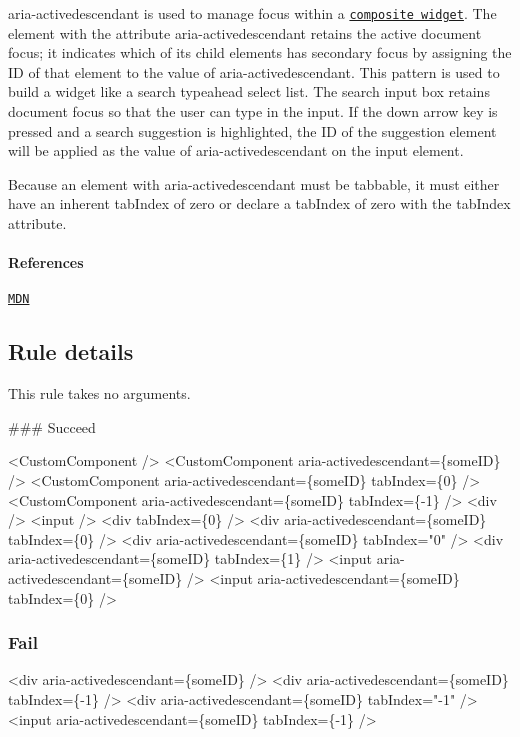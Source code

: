 {\ttfamily aria-\/activedescendant} is used to manage focus within a \href{https://www.w3.org/TR/wai-aria/roles#composite_header}{\tt composite widget}. The element with the attribute {\ttfamily aria-\/activedescendant} retains the active document focus; it indicates which of its child elements has secondary focus by assigning the ID of that element to the value of {\ttfamily aria-\/activedescendant}. This pattern is used to build a widget like a search typeahead select list. The search input box retains document focus so that the user can type in the input. If the down arrow key is pressed and a search suggestion is highlighted, the ID of the suggestion element will be applied as the value of {\ttfamily aria-\/activedescendant} on the input element.

Because an element with {\ttfamily aria-\/activedescendant} must be tabbable, it must either have an inherent {\ttfamily tab\+Index} of zero or declare a {\ttfamily tab\+Index} of zero with the {\ttfamily tab\+Index} attribute.

\paragraph*{References}


\begin{DoxyEnumerate}
\item \href{https://developer.mozilla.org/en-US/docs/Web/Accessibility/ARIA/ARIA_Techniques/Using_the_aria-activedescendant_attribute}{\tt M\+DN}
\end{DoxyEnumerate}

\subsection*{Rule details}

This rule takes no arguments.

\#\#\# Succeed 
\begin{DoxyCode}
<CustomComponent />
<CustomComponent aria-activedescendant=\{someID\} />
<CustomComponent aria-activedescendant=\{someID\} tabIndex=\{0\} />
<CustomComponent aria-activedescendant=\{someID\} tabIndex=\{-1\} />
<div />
<input />
<div tabIndex=\{0\} />
<div aria-activedescendant=\{someID\} tabIndex=\{0\} />
<div aria-activedescendant=\{someID\} tabIndex="0" />
<div aria-activedescendant=\{someID\} tabIndex=\{1\} />
<input aria-activedescendant=\{someID\} />
<input aria-activedescendant=\{someID\} tabIndex=\{0\} />
\end{DoxyCode}


\subsubsection*{Fail}


\begin{DoxyCode}
<div aria-activedescendant=\{someID\} />
<div aria-activedescendant=\{someID\} tabIndex=\{-1\} />
<div aria-activedescendant=\{someID\} tabIndex="-1" />
<input aria-activedescendant=\{someID\} tabIndex=\{-1\} />
\end{DoxyCode}
 